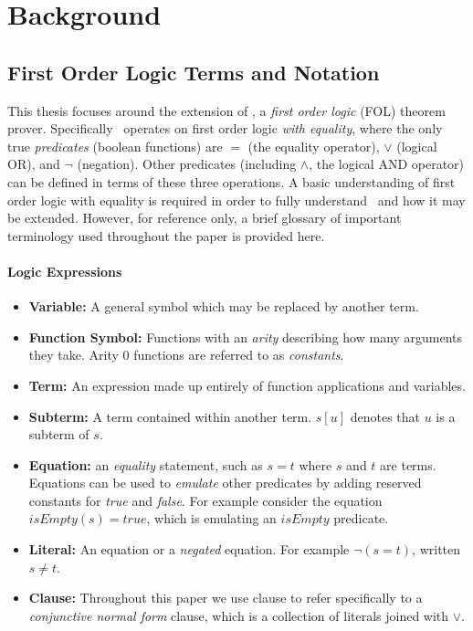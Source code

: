 
\chapter{Background}
\label{cha:background}

\section{First Order Logic Terms and Notation}
\label{sec:terminology}

This thesis focuses around the extension of \beagle, a \emph{first order logic} (FOL) theorem prover.
Specifically \beagle\ operates on first order logic \emph{with equality}, where the only
true \emph{predicates} (boolean functions) are $=$ (the equality operator), $\lor$ (logical OR),  and
$\lnot$ (negation). Other predicates (including $\land$, the logical AND operator) can be defined
in terms of these three operations. A basic understanding of first order logic with equality is required
in order to fully understand \beagle\ and how it may be extended. However, for reference only,
a brief glossary of important terminology used throughout the paper is provided here.

\subsubsection{Logic Expressions}

\begin{itemize}
\item \textbf{Variable:} A general symbol which may be replaced by another term.
\item \textbf{Function Symbol:} Functions with an \emph{arity} describing how many
arguments they take. Arity 0 functions are referred to as \emph{constants}.
\item \textbf{Term:} An expression made up entirely of function applications and variables.
\item \textbf{Subterm:} A term contained within another term. $s[u]$ denotes that
$u$ is a subterm of $s$.
\item \textbf{Equation:} an \emph{equality} statement, such as $s = t$ where $s$
and $t$ are terms. Equations can be used to \emph{emulate} other predicates
by adding reserved constants for \emph{true} and \emph{false}. For example consider the equation $isEmpty(s) = true$, which
is emulating an $isEmpty$ predicate.
\item \textbf{Literal:} An equation or a \emph{negated} equation. For example $\lnot (s = t)$,
written $s \neq t$.
\item \textbf{Clause:} Throughout this paper we use clause to refer specifically to a \emph{conjunctive normal form} clause,
which is a collection of literals joined with $\lor$.
\end{itemize}

